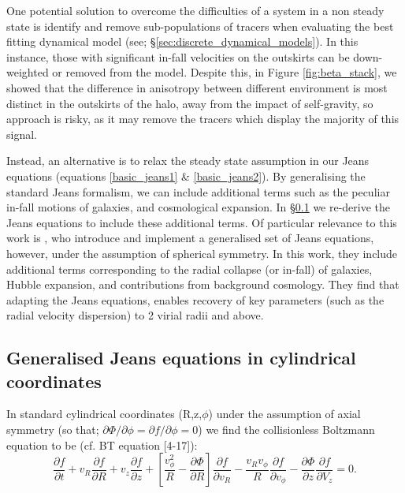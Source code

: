 One potential solution to overcome the difficulties of a system in a non steady state is identify and remove sub-populations of tracers when evaluating the best fitting dynamical model (see; \S\ref{sec:discrete_dynamical_models}). In this instance, those with significant in-fall velocities on the outskirts can be down-weighted or removed from the model. Despite this, in Figure \ref{fig:beta_stack}, we showed that the difference in anisotropy between different environment is most distinct in the outskirts of the halo, away from the impact of self-gravity, so approach is risky, as it may remove the tracers which display the majority of this signal.

Instead, an alternative is to relax the steady state assumption in our Jeans equations (equations \ref{basic_jeans1} \& \ref{basic_jeans2}). By generalising the standard Jeans formalism, we can include additional terms such as the peculiar in-fall motions of galaxies, and cosmological expansion. In \S\ref{sec:jeans_rederivation} we re-derive the Jeans equations to include these additional terms. Of particular relevance to this work is \citet{falco2013}, who introduce and implement a generalised set of Jeans equations, however, under the assumption of spherical symmetry. In this work, they include additional terms corresponding to the radial collapse (or in-fall) of galaxies, Hubble expansion, and contributions from background cosmology. They find that adapting the Jeans equations, enables recovery of key parameters (such as the radial velocity dispersion) to 2 virial radii and above. 

\subsection{Generalised Jeans equations in cylindrical coordinates} \label{sec:jeans_rederivation}
In standard cylindrical coordinates (R,z,$\phi$) under the assumption of axial symmetry (so that; $\partial \Phi / \partial \phi = \partial f / \partial \phi = 0$) we find the collisionless Boltzmann equation to be (cf. BT equation [4-17]): 
\begin{equation} \label{eq:CBE}
\frac{\partial f}{\partial t} + v_R \frac{\partial f}{\partial R} + v_z \frac{\partial f}{\partial z} + \left[\frac{v_{\phi}^2}{R} - \frac{\partial \Phi}{\partial R}\right] \frac{\partial f}{\partial v_R} - \frac{v_R v_{\phi}}{R} \frac{\partial f}{\partial v_{\phi}} - \frac{\partial \Phi}{\partial z} \frac{\partial f}{\partial V_z} = 0.
\end{equation}

